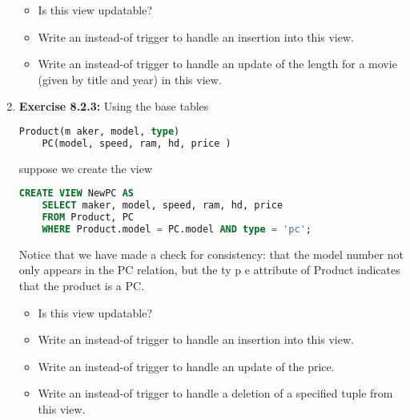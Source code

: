 \documentclass[12pt]{article}
\begin{document}
\begin{enumerate}[1.]
    \bigskip

    \begin{itemize}
        \item Is this view updatable?
        \item Write an instead-of trigger to handle an insertion into this view.
        \item Write an instead-of trigger to handle an update of the length for a movie (given by title and year) in this view.
    \end{itemize}

    \item \textbf{Exercise 8.2.3:} Using the base tables

    \bigskip

    \begin{lstlisting}[language=SQL]
    Product(m aker, model, type)
    PC(model, speed, ram, hd, price )
    \end{lstlisting}

    \bigskip

    suppose we create the view

    \bigskip

    \begin{lstlisting}[language=SQL]
    CREATE VIEW NewPC AS
    SELECT maker, model, speed, ram, hd, price
    FROM Product, PC
    WHERE Product.model = PC.model AND type = 'pc';
    \end{lstlisting}

    \bigskip

    Notice that we have made a check for consistency: that the model number not
    only appears in the PC relation, but the ty p e attribute of Product indicates
    that the product is a PC.

    \bigskip

    \begin{itemize}
        \item Is this view updatable?
        \item Write an instead-of trigger to handle an insertion into this view.
        \item Write an instead-of trigger to handle an update of the price.
        \item Write an instead-of trigger to handle a deletion of a specified tuple from this view.
    \end{itemize}

\end{enumerate}
\end{document}
